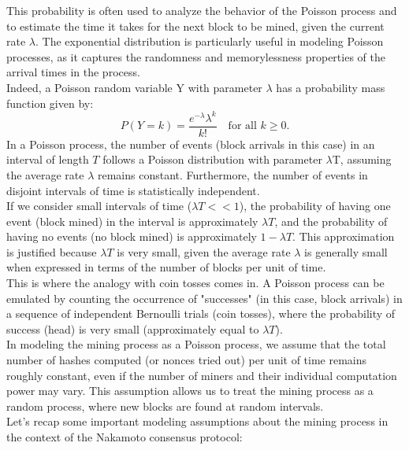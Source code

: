This probability is often used to analyze the behavior of the Poisson process and to estimate the time it takes for the next block to be mined, given the current rate $\lambda$. The exponential distribution is particularly useful in modeling Poisson processes, as it captures the randomness and memorylessness properties of the arrival times in the process.\\
Indeed, a Poisson random variable Y with parameter $\lambda$ has a probability mass function given by:
$$P(Y = k) = \frac{e^{-\lambda} \lambda^k}{k!} \quad \text{for all } k \geq 0.$$
In a Poisson process, the number of events (block arrivals in this case) in an interval of length $T$ follows a Poisson distribution with parameter $\lambda$T, assuming the average rate  $\lambda$ remains constant. Furthermore, the number of events in disjoint intervals of time is statistically independent.\\
If we consider small intervals of time ($\lambda T << 1$), the probability of having one event (block mined) in the interval is approximately  $\lambda T$, and the probability of having no events (no block mined) is approximately $1 - \lambda T$. This approximation is justified because $\lambda T$ is very small, given the average rate $\lambda$ is generally small when expressed in terms of the number of blocks per unit of time.\\
This is where the analogy with coin tosses comes in. A Poisson process can be emulated by counting the occurrence of "successes" (in this case, block arrivals) in a sequence of independent Bernoulli trials (coin tosses), where the probability of success (head) is very small (approximately equal to $\lambda T$).\\
In modeling the mining process as a Poisson process, we assume that the total number of hashes computed (or nonces tried out) per unit of time remains roughly constant, even if the number of miners and their individual computation power may vary. This assumption allows us to treat the mining process as a random process, where new blocks are found at random intervals.\\
Let's recap some important modeling assumptions about the mining process in the context of the Nakamoto consensus protocol:\\
